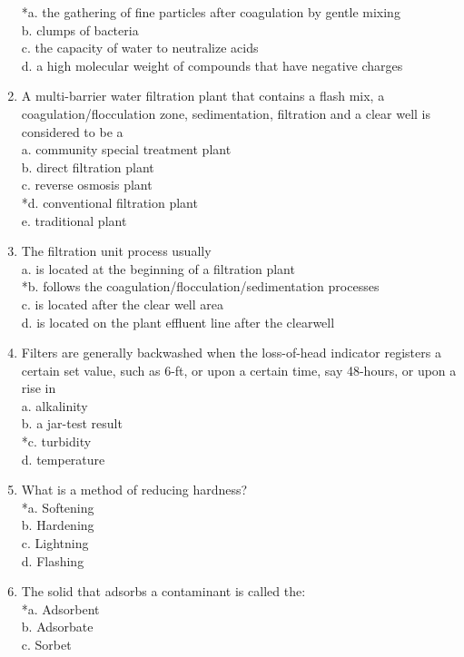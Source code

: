 \begin{enumerate}[1.]
*a. the gathering of fine particles after coagulation by gentle mixing\\
b. clumps of bacteria\\
c. the capacity of water to neutralize acids\\
d. a high molecular weight of compounds that have negative charges\\
\item A multi-barrier water filtration plant that contains a flash mix, a coagulation/flocculation zone, sedimentation, filtration and a clear well is considered to be a\\
a. community special treatment plant\\
b. direct filtration plant\\
c. reverse osmosis plant\\
*d. conventional filtration plant\\
e. traditional plant\\
\item The filtration unit process usually\\
a. is located at the beginning of a filtration plant\\
*b. follows the coagulation/flocculation/sedimentation processes\\
c. is located after the clear well area\\
d. is located on the plant effluent line after the clearwell\\
\item Filters are generally backwashed when the loss-of-head indicator registers a certain set value, such as 6-ft, or upon a certain time, say 48-hours, or upon a rise in\\
a. alkalinity\\
b. a jar-test result\\
*c. turbidity\\
d. temperature\\
\item What is a method of reducing hardness?\\
*a. Softening\\
b. Hardening\\
c. Lightning\\
d. Flashing\\
\item The solid that adsorbs a contaminant is called the:\\
*a. Adsorbent\\
b. Adsorbate\\
c. Sorbet\\

\end{enumerate}
